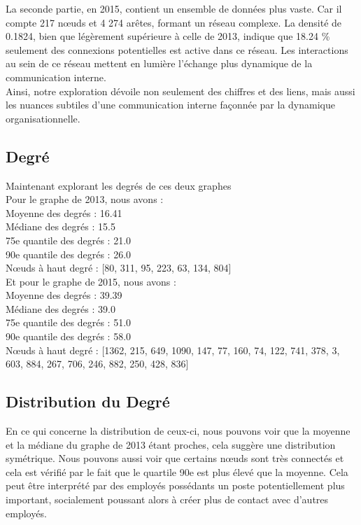 \documentclass{article}
\begin{document}
La seconde partie, en 2015, contient un ensemble de données plus vaste. Car il compte 217 nœuds et 4 274 arêtes, formant un réseau complexe. La densité de 0.1824, bien que légèrement supérieure à celle de 2013, indique que 18.24 \% seulement des connexions potentielles est active dans ce réseau. Les interactions au sein de ce réseau mettent en lumière l’échange plus dynamique de la communication interne. \\

Ainsi, notre exploration dévoile non seulement des chiffres et des liens, mais aussi les nuances subtiles d'une communication interne façonnée par la dynamique organisationnelle.

\subsection{Degré}

Maintenant explorant les degrés de ces deux graphes \\

Pour le graphe de 2013, nous avons : \\
Moyenne des degrés : 16.41 \\
Médiane des degrés : 15.5 \\
75e quantile des degrés : 21.0 \\
90e quantile des degrés : 26.0 \\
Nœuds à haut degré : [80, 311, 95, 223, 63, 134, 804] \\

Et pour le graphe de 2015, nous avons :  \\
Moyenne des degrés : 39.39 \\
Médiane des degrés : 39.0 \\
75e quantile des degrés : 51.0 \\
90e quantile des degrés : 58.0 \\
Nœuds à haut degré : [1362, 215, 649, 1090, 147, 77, 160, 74, 122, 741, 378, 3, 603, 884, 267, 706, 246, 882, 250, 428, 836]

\subsection{Distribution du Degré}

En ce qui concerne la distribution de ceux-ci, nous pouvons voir que la moyenne et la médiane du graphe de 2013 étant proches, cela suggère une distribution symétrique.
Nous pouvons aussi voir que certains nœuds sont très connectés et cela est vérifié par le fait que le quartile 90e est plus élevé que la moyenne. Cela peut être interprété par des employés possédants un poste potentiellement plus important, socialement poussant alors à créer plus de contact avec d’autres employés. \\
\end{document}

